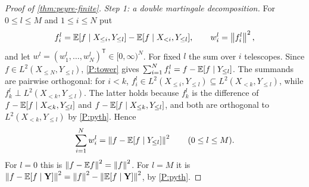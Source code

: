 \begin{proof}[Proof of \cref{thm:peyre-finite}]
\emph{Step 1: a double martingale decomposition.} For $0\le l\le M$ and
$1\le i\le N$ put
\[
  f_i^l=\mathbb E[f\mid X_{\le i},Y_{\le l}]-\mathbb E[f\mid X_{<i},Y_{\le l}],\qquad
  w_i^l=\left\|f_i^l\right\|^2 ,
\]
and let $w^l=(w_1^l,\dots,w_N^l)^{\mathsf T}\in[0,\infty)^N$. For fixed $l$
the sum over $i$ telescopes. Since $f\in L^2(X_{\le N},Y_{\le l})$,
\ref{P:tower} gives $\sum_{i=1}^Nf_i^l=f-\mathbb E[f\mid Y_{\le l}]$. The summands
are pairwise orthogonal: for $i<k$,
$f_i^l\in L^2(X_{\le i},Y_{\le l})\subseteq L^2(X_{<k},Y_{\le l})$, while
$f_k^l\perp L^2(X_{<k},Y_{\le l})$. The latter holds because $f_k^l$ is the
difference of $f-\mathbb E[f\mid X_{<k},Y_{\le l}]$ and
$f-\mathbb E[f\mid X_{\le k},Y_{\le l}]$, and both are orthogonal to
$L^2(X_{<k},Y_{\le l})$ by \ref{P:pyth}. Hence
\begin{equation}\label{eq:peyre:sum}
  \sum_{i=1}^Nw_i^l=\left\|f-\mathbb E[f\mid Y_{\le l}]\right\|^2\qquad(0\le l\le M).
\end{equation}
For $l=0$ this is $\left\|f-\mathbb E f\right\|^2=\left\|f\right\|^2$. For $l=M$ it is
$\left\|f-\mathbb E[f\mid\mathbf Y]\right\|^2=\left\|f\right\|^2-\left\|\mathbb E[f\mid\mathbf Y]\right\|^2$, by
\ref{P:pyth}.


\end{proof}
